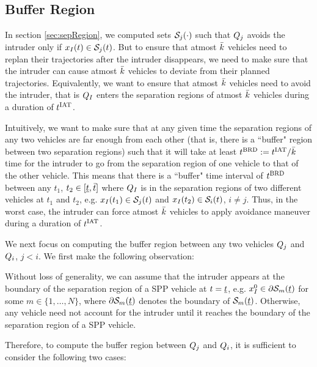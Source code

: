\subsection{Buffer Region} \label{sec:buffRegion_case1}



In section \ref{sec:sepRegion}, we computed sets $\mathcal{S}_j(\cdot)$ such that $Q_j$ avoids the intruder only if $x_{I}(t) \in \mathcal{S}_j(t)$. But to ensure that atmost $\bar{k}$ vehicles need to replan their trajectories after the intruder disappears, we need to make sure that the intruder can cause atmost $\bar{k}$ vehicles to deviate from their planned trajectories. Equivalently, we want to ensure that atmost $\bar{k}$ vehicles need to avoid the intruder, that is $Q_{I}$ enters the separation regions of atmost $\bar{k}$ vehicles during a duration of $t^\text{IAT}$.

Intuitively, we want to make sure that at any given time the separation regions of any two vehicles are far enough from each other (that is, there is a ``buffer" region between two separation regions) such that it will take at least $t^\text{BRD} := t^\text{IAT} / \bar{k}$ time for the intruder to go from the separation region of one vehicle to that of the other vehicle. This means that there is a ``buffer" time interval of $t^\text{BRD}$ between any $t_1$, $t_2 \in [\underline{t}, \bar{t}]$ where $Q_{I}$ is in the separation regions of two different vehicles at $t_1$ and $t_2$, e.g. $x_{I}(t_1) \in \mathcal{S}_j(t)$ and $x_{I}(t_2) \in \mathcal{S}_i(t)$, $i \neq j$. Thus, in the worst case, the intruder can force atmost $\bar{k}$ vehicles to apply avoidance maneuver during a duration of $t^\text{IAT}$. 

We next focus on computing the buffer region between any two vehicles $Q_j$ and $Q_i$, $j < i$. We first make the following observation:
\begin{observation} \label{obs1_buffReg}
Without loss of generality, we can assume that the intruder appears at the boundary of the separation region of a SPP vehicle at $t = \underline{t}$, e.g. $x_{I}^0 \in \partial \mathcal{S}_m(\underline{t})$ for some $m \in \{1, \ldots, N\}$, where $\partial \mathcal{S}_m(\underline{t})$ denotes the boundary of $\mathcal{S}_m(\underline{t})$. Otherwise, any vehicle need not account for the intruder until it reaches the boundary of the separation region of a SPP vehicle. 
\end{observation}
Therefore, to compute the buffer region between $Q_j$ and $Q_i$, it is sufficient to consider the following two cases:     
